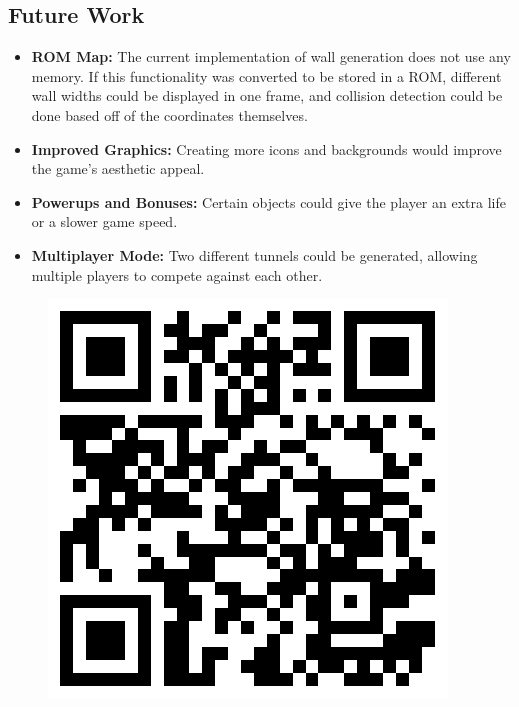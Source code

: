 \documentclass[11pt]{article}
\begin{document}
	\subsection{Future Work}

	
	\begin{itemize}
	\item \textbf{ROM Map:} The current implementation of wall generation does not use any memory.  If this functionality was converted to be stored in a ROM, different wall widths could be displayed in one frame, and collision detection could be done based off of the coordinates themselves. 
	\item \textbf{Improved Graphics:} Creating more icons and backgrounds would improve the game's aesthetic appeal.
	\item \textbf{Powerups and Bonuses:} Certain objects could give the player an extra life or a slower game speed.
	\item \textbf{Multiplayer Mode:} Two different tunnels could be generated, allowing multiple players to compete against each other. 
	
	\end{itemize}
	

		\begin{figure}[h]
		  \begin{flushright}
		  \includegraphics[width=.1\textwidth]{Images/qrcode.png}
		  \label{qrcode}
		  \end{flushright}
		\end{figure}		
		
	
	
\end{document}
